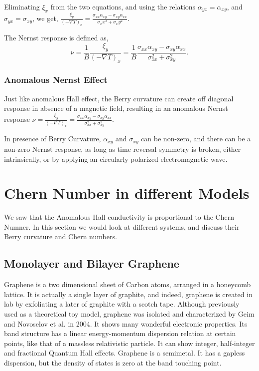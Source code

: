 \documentclass{report}
\begin{document}
Eliminating $\xi_x$ from the two equations, and using the relations $\alpha_{y x} = \alpha_{x y}$, and $\sigma_{y x} = \sigma_{x y}$, we get, $\frac{\xi_y}{(-\nabla T)_x} = \frac{\sigma_{xx} \alpha_{xy} - \sigma_{xy} \alpha_{xx}}{\sigma_xx ^2 + \sigma_xy ^2}$.

The Nernst response is defined \cite{Ussishkin_2002} as,
$$\nu = \frac{1}{B} \frac{\xi_y}{(-\nabla T)_x} = \frac{1}{B} \frac{\sigma_{xx} \alpha_{xy} - \sigma_{xy} \alpha_{xx}}{\sigma_{xx} ^2 + \sigma_{xy} ^2}.$$



\subsection{Anomalous Nernst Effect}
Just like anomalous Hall effect, the Berry curvature can create off diagonal response in absence of a magnetic field, resulting in an anomalous Nernst response
$\nu = \frac{\xi_y}{(-\nabla T)_x} = \frac{\sigma_{xx} \alpha_{xy} - \sigma_{xy} \alpha_{xx}}{\sigma_{xx} ^2 + \sigma_{xy} ^2}$.

In presence of Berry Curvature, $\alpha_{xy}$ and $\sigma_{xy}$ can be non-zero, and there can be a non-zero Nernst response, as long as time reversal symmetry is broken, either intrinsically, or by applying an circularly polarized electromagnetic wave.
\chapter{Chern Number in different Models}\label{chap:ChernNumber}
We saw that the Anomalous Hall conductivity is proportional to the Chern Numner. In this section we would look at different systems, and discuss their Berry curvature and Chern numbers.
\section{Monolayer and Bilayer Graphene}
Graphene is a two dimensional sheet of Carbon atoms, arranged in a honeycomb lattice. It is actually a single layer of graphite, and indeed, graphene is created in lab by exfoliating a later of graphite with a scotch tape. Although previously used as a theoretical toy model, graphene was isolated and characterized by Geim and Novoselov et al. \cite{NovoselovGeimGraphene666} in 2004. It shows many wonderful electronic properties. Its band structure has a linear energy-momentum dispersion \cite{NovoselovGrapheneDirac2005} relation at certain points, like that of a massless relativistic particle. It can show integer, half-integer \cite{Zhang2005GrapheneQHEBerry} and fractional \cite{Bolotin2009GrapheneFQHE} Quantum Hall effects. Graphene is a semimetal. It has a gapless dispersion, but the density of states is zero at the band touching point.
\end{document}
